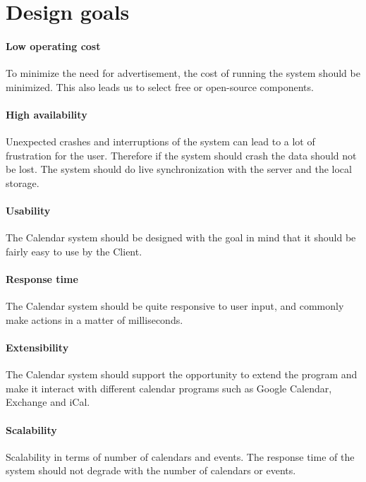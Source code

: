 \section{Design goals}

\paragraph{Low operating cost}\mbox{}\newline %
To minimize the need for advertisement, the cost of running the system should be minimized. This also leads us to select free or open-source components.

\paragraph{High availability}\mbox{}\newline
Unexpected crashes and interruptions of the system can lead to a lot of frustration for the user. Therefore if the system should crash the data should not be lost. The system should do live synchronization with the server and the local storage.

\paragraph{Usability}\mbox{}\newline
The Calendar system should be designed with the goal in mind that it should be fairly easy to use by the Client. 

\paragraph{Response time}\mbox{}\newline
The Calendar system should be quite responsive to user input, and commonly make actions in a matter of milliseconds. 

\paragraph{Extensibility}\mbox{}\newline
The Calendar system should support the opportunity to extend the program and make it interact with different calendar programs such as Google Calendar, Exchange and iCal. 

\paragraph{Scalability}\mbox{}\newline
Scalability in terms of number of calendars and events. The response time of the system should not degrade with the number of calendars or events. 